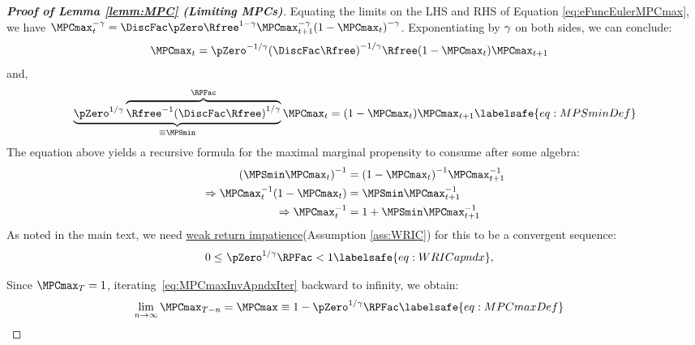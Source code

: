 \documentclass[\econtexRoot/BufferStockTheory]{subfiles}
\begin{document}
\begin{proof}[\textbf{Proof of Lemma \ref{lemm:MPC} (Limiting MPCs)}]
Equating the limits on the LHS and RHS of Equation \eqref{eq:eFuncEulerMPCmax}, we have $\MPCmax_{t}^{-\CRRA }=\DiscFac
\pZero\Rfree^{1-\CRRA }\MPCmax_{t+1}^{-\CRRA }{(1-\MPCmax
_{t})}^{-\CRRA }$.
Exponentiating by $\gamma$ on both sides, we can conclude:
%
%
\begin{equation}\label{eq:mpcmaxiter}\begin{gathered}\begin{aligned}
\MPCmax_{t} & = \pZero^{-1/\CRRA} {(\DiscFac
\Rfree)}^{-1/\CRRA}\Rfree(1-\MPCmax _{t})\MPCmax _{t+1} \notag
\end{aligned}\end{gathered}\end{equation}
%
%
and, 
%
%
\begin{equation}
 \underbrace{\pZero^{1/\CRRA}\overbrace{{\Rfree}^{-1}{(\DiscFac
    \Rfree)}^{1/\CRRA}}^{\RPFac}}_{\equiv \MPSmin} \MPCmax_{t}  = (1-\MPCmax _{t})\MPCmax _{t+1} \labelsafe{eq:MPSminDef}
\end{equation}
%
%
The equation above yields a recursive formula for the maximal marginal propensity to consume after some algebra:
%
%
\begin{equation}\begin{gathered}\begin{aligned}
  {(\MPSmin \MPCmax_{t})}^{-1}  & = {(1-\MPCmax_{t})}^{-1}\MPCmax_{t+1}^{-1}  \notag
\\ \Rightarrow \MPCmax_{t}^{-1}(1-\MPCmax_{t})  & = \MPSmin \MPCmax_{t+1}^{-1}   \notag
\\ \Rightarrow  \MPCmax_{t}^{-1}  & = 1+\MPSmin \MPCmax_{t+1}^{-1} \label{eq:MPCmaxInvApndxIter}
\end{aligned}\end{gathered}\end{equation}
%
%
As noted in the main text, we need \hyperlink{WRIC}{weak return impatience}(Assumption \ref{ass:WRIC}) for this to be a convergent sequence:
\begin{equation}\begin{gathered}\begin{aligned}
  0 \leq & ~\pZero^{1/\CRRA} \RPFac < 1 \labelsafe{eq:WRICapndx},
\end{aligned}\end{gathered}\end{equation}

Since $\MPCmax_{T}=1$, iterating~\eqref{eq:MPCmaxInvApndxIter} backward to
infinity, we obtain:
\begin{equation}\begin{gathered}\begin{aligned}
\lim_{n\rightarrow\infty}\MPCmax_{T-n} 
& = \MPCmax \equiv 1-\pZero^{1/\CRRA}\RPFac  \labelsafe{eq:MPCmaxDef}
\end{aligned}\end{gathered}\end{equation}


\end{proof}
\end{document}
